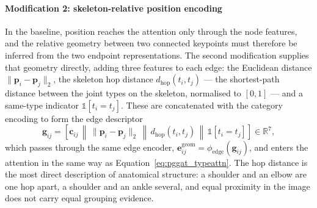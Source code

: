\paragraph{Modification 2: skeleton-relative position encoding}
In the baseline, position reaches the attention only through the node features,
and the relative geometry between two connected keypoints must therefore be inferred from the two endpoint representations.
The second modification supplies that geometry directly, adding three features to each edge:
the Euclidean distance $\|\mathbf{p}_i-\mathbf{p}_j\|_2$, the skeleton hop distance $d_{\text{hop}}(t_i,t_j)$
--- the shortest-path distance between the joint types on the skeleton, normalised to $[0,1]$ ---
and a same-type indicator $\mathbb{1}[t_i=t_j]$.
These are concatenated with the category encoding to form the edge descriptor
\begin{equation}
    \mathbf{g}_{ij}
    =
    \left[
        \mathbf{c}_{ij}
        \,\middle\|\,
        \|\mathbf{p}_i-\mathbf{p}_j\|_2
        \,\middle\|\,
        d_{\text{hop}}(t_i,t_j)
        \,\middle\|\,
        \mathbb{1}[t_i=t_j]
    \right]
    \in \mathbb{R}^{7},
    \label{eq:edge_descriptor}
\end{equation}
which passes through the same edge encoder, $\mathbf{e}_{ij}^{\text{geom}} = \phi_{\text{edge}}(\mathbf{g}_{ij})$,
and enters the attention in the same way as Equation~\eqref{eq:pggat_typeattn}.
The hop distance is the most direct description of anatomical structure:
a shoulder and an elbow are one hop apart, a shoulder and an ankle several,
and equal proximity in the image does not carry equal grouping evidence.

